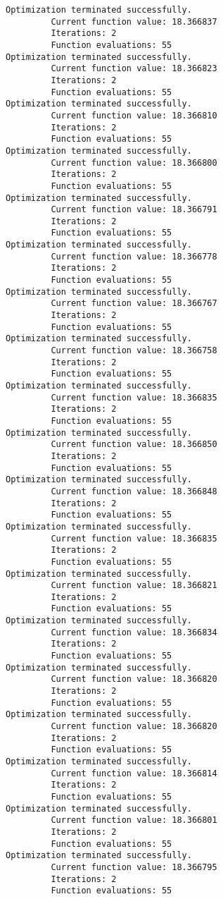 \documentclass[11pt]{article}
\begin{document}
\begin{Verbatim}[commandchars=\\\{\}]
Optimization terminated successfully.
         Current function value: 18.366837
         Iterations: 2
         Function evaluations: 55
Optimization terminated successfully.
         Current function value: 18.366823
         Iterations: 2
         Function evaluations: 55
Optimization terminated successfully.
         Current function value: 18.366810
         Iterations: 2
         Function evaluations: 55
Optimization terminated successfully.
         Current function value: 18.366800
         Iterations: 2
         Function evaluations: 55
Optimization terminated successfully.
         Current function value: 18.366791
         Iterations: 2
         Function evaluations: 55
Optimization terminated successfully.
         Current function value: 18.366778
         Iterations: 2
         Function evaluations: 55
Optimization terminated successfully.
         Current function value: 18.366767
         Iterations: 2
         Function evaluations: 55
Optimization terminated successfully.
         Current function value: 18.366758
         Iterations: 2
         Function evaluations: 55
Optimization terminated successfully.
         Current function value: 18.366835
         Iterations: 2
         Function evaluations: 55
Optimization terminated successfully.
         Current function value: 18.366850
         Iterations: 2
         Function evaluations: 55
Optimization terminated successfully.
         Current function value: 18.366848
         Iterations: 2
         Function evaluations: 55
Optimization terminated successfully.
         Current function value: 18.366835
         Iterations: 2
         Function evaluations: 55
Optimization terminated successfully.
         Current function value: 18.366821
         Iterations: 2
         Function evaluations: 55
Optimization terminated successfully.
         Current function value: 18.366834
         Iterations: 2
         Function evaluations: 55
Optimization terminated successfully.
         Current function value: 18.366820
         Iterations: 2
         Function evaluations: 55
Optimization terminated successfully.
         Current function value: 18.366820
         Iterations: 2
         Function evaluations: 55
Optimization terminated successfully.
         Current function value: 18.366814
         Iterations: 2
         Function evaluations: 55
Optimization terminated successfully.
         Current function value: 18.366801
         Iterations: 2
         Function evaluations: 55
Optimization terminated successfully.
         Current function value: 18.366795
         Iterations: 2
         Function evaluations: 55

\end{Verbatim}
\end{document}
